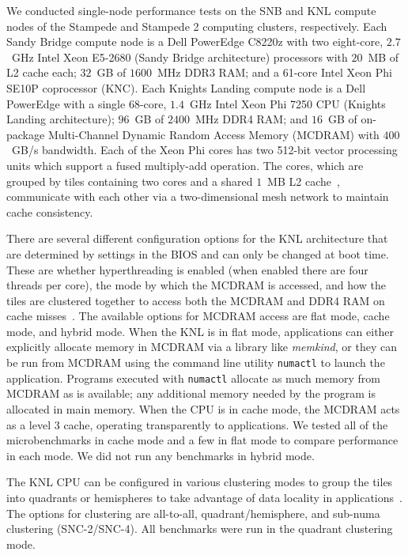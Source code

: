 We conducted single-node performance tests on the SNB and KNL compute nodes of the
Stampede and Stampede 2 computing clusters, respectively. Each Sandy Bridge compute node
is a Dell PowerEdge C8220z with two eight-core, $2.7$~GHz Intel Xeon
E5-2680 (Sandy Bridge architecture) processors with $20$~MB of L2 cache each; $32$~GB of
$1600$~MHz DDR3 RAM; and a 61-core Intel Xeon Phi SE10P coprocessor (KNC). Each Knights Landing
compute node is a Dell PowerEdge with a single 68-core, $1.4$~GHz Intel
Xeon Phi 7250 CPU (Knights Landing architecture); $96$~GB of $2400$~MHz DDR4 RAM; and
$16$~GB of on-package Multi-Channel Dynamic Random Access Memory (MCDRAM) with $400$~GB/s
bandwidth. Each of the Xeon Phi cores has two 512-bit vector processing units which
support a fused multiply-add operation. The cores, which are grouped by tiles containing
two cores and a shared $1$~MB L2 cache~\cite{intel:xeonphi}, communicate with each other
via a two-dimensional mesh network to maintain cache consistency.

There are several different configuration options for the KNL architecture that are
determined by settings in the BIOS and can only be changed at boot time. These are whether
hyperthreading is enabled (when enabled there are four threads per core), the mode by
which the MCDRAM is accessed, and how the tiles are clustered together to access both the
MCDRAM and DDR4 RAM on cache misses~\cite{vladimirov:knlModes, asai:mcdramKnl}.  The
available options for MCDRAM access are flat mode, cache mode, and hybrid mode.  When the
KNL is in flat mode, applications can either explicitly allocate memory in MCDRAM via a
library like \textit{memkind}, or they can be run from MCDRAM using the command line
utility \texttt{numactl} to launch the application. Programs executed with
\texttt{numactl} allocate as much memory from MCDRAM as is available; any additional
memory needed by the program is allocated in main memory. When the CPU is in cache mode,
the MCDRAM acts as a level 3 cache, operating transparently to applications. We tested all
of the microbenchmarks in cache mode and a few in flat mode to compare performance in each
mode. We did not run any benchmarks in hybrid mode.

The KNL CPU can be configured in various clustering modes to group the tiles into
quadrants or hemispheres to take advantage of data locality in
applications~\cite{vladimirov:knlModes,}. The options for clustering are all-to-all,
quadrant/hemisphere, and sub-numa clustering (SNC-2/SNC-4). All benchmarks were run in the
quadrant clustering mode.

